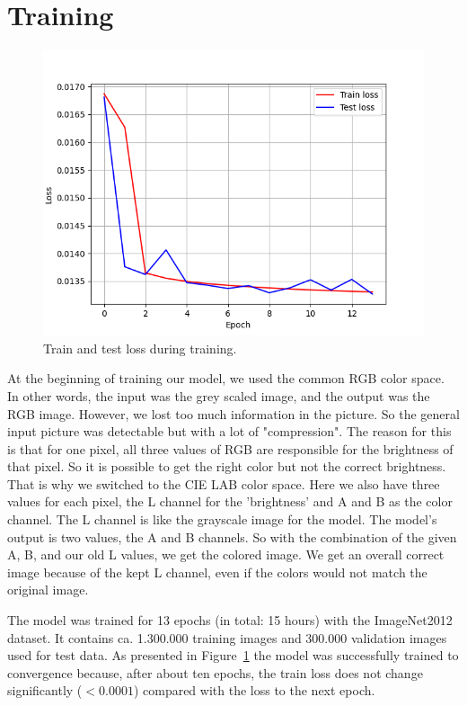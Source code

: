 \documentclass[a4paper,12pt, listof=totoc,toc=sectionentrywithdots]{scrartcl}
\begin{document}
\section{Training}

\begin{figure}

\centering
        \includegraphics[totalheight=6cm]{Figures/LossPlot.png}
    \caption{Train and test loss during training.}
    \label{fig:trainTestLoss}

\end{figure}
At the beginning of training our model, we used the common RGB color space.
In other words, the input was the grey scaled image, and the output was the RGB image.
However, we lost too much information in the picture.
So the general input picture was detectable but with a lot of "compression".
The reason for this is that for one pixel, all three values of RGB are responsible for the brightness of that pixel.
So it is possible to get the right color but not the correct brightness. That is why we switched to the CIE LAB color space.
Here we also have three values for each pixel, the L channel for the
'brightness' and A and B as the color channel.
The L channel is like the grayscale image for the model.
The model's output is two values, the A and B channels.
So with the combination of the given A, B, and our old L values, we get the colored image. We get an overall correct image because of the kept L channel, even if the colors would not match the original
image.

The model was trained for 13 epochs (in total: 15 hours) with the ImageNet2012 dataset.
It contains ca. 1.300.000 training images and 300.000 validation images used for test data.
As presented in Figure~\ref{fig:trainTestLoss} the model was successfully trained to convergence because, after about ten epochs, the train loss does not change significantly ($< 0.0001$) compared with the loss to the next epoch.
\end{document}
